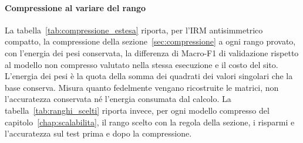 \paragraph{Compressione al variare del rango}
La tabella~\ref{tab:compressione_estesa} riporta, per l'IRM antisimmetrico compatto, la compressione della sezione~\ref{sec:compressione} a ogni rango provato, con l'energia dei pesi conservata, la differenza di Macro-F1 di validazione rispetto al modello non compresso valutato nella stessa esecuzione e il costo del sito. L'energia dei pesi è la quota della somma dei quadrati dei valori singolari che la base conserva. Misura quanto fedelmente vengano ricostruite le matrici, non l'accuratezza conservata né l'energia consumata dal calcolo. La tabella~\ref{tab:ranghi_scelti} riporta invece, per ogni modello compresso del capitolo~\ref{chap:scalabilita}, il rango scelto con la regola della sezione, i risparmi e l'accuratezza sul test prima e dopo la compressione.

